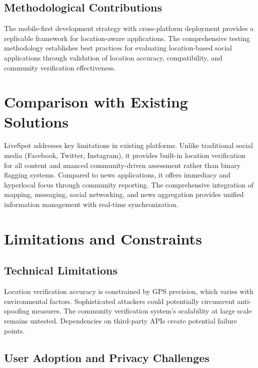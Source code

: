 \subsection{Methodological Contributions}
\label{subsec:methodological_contributions}

The mobile-first development strategy with cross-platform deployment provides a replicable framework for location-aware applications. The comprehensive testing methodology establishes best practices for evaluating location-based social applications through validation of location accuracy, compatibility, and community verification effectiveness.

\section{Comparison with Existing Solutions}
\label{sec:comparison}

LiveSpot addresses key limitations in existing platforms. Unlike traditional social media (Facebook, Twitter, Instagram), it provides built-in location verification for all content and nuanced community-driven assessment rather than binary flagging systems. Compared to news applications, it offers immediacy and hyperlocal focus through community reporting. The comprehensive integration of mapping, messaging, social networking, and news aggregation provides unified information management with real-time synchronization.

\section{Limitations and Constraints}
\label{sec:limitations}

\subsection{Technical Limitations}
\label{subsec:technical_limitations}

Location verification accuracy is constrained by GPS precision, which varies with environmental factors. Sophisticated attackers could potentially circumvent anti-spoofing measures. The community verification system's scalability at large scale remains untested. Dependencies on third-party APIs create potential failure points.

\subsection{User Adoption and Privacy Challenges}
\label{subsec:adoption_challenges}

